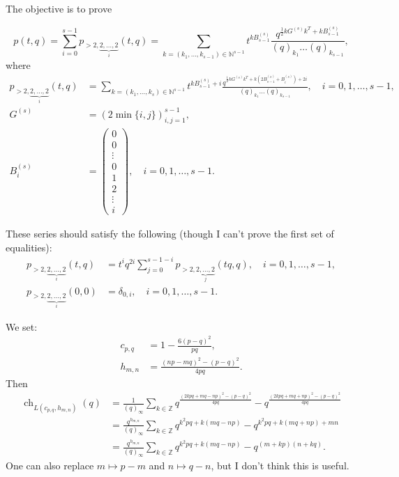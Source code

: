 \documentclass[a4paper, 12pt, reqno]{amsart}
\DeclareMathOperator{\ch}{ch}
\begin{document}
The objective is to prove

\begin{equation*}
  p(t, q) = \sum_{i = 0}^{s - 1}p_{>2, \underbrace{\scriptstyle{2, \dots, 2}}_i}(t, q) = \sum_{k = (k_1, \dots, k_{s - 1}) \in \mathbb{N}^{s - 1}}t^{kB^{(s)}_{s - 1}}\frac{q^{\frac{1}{2}kG^{(s)}k^T + kB^{(s)}_{s - 1}}}{(q)_{k_1}\dots (q)_{k_{s - 1}}},
\end{equation*}
where
\begin{align*}
  p_{>2, \underbrace{\scriptstyle{2, \dots, 2}}_i}(t, q) &= \sum_{k = (k_1, \dots, k_s) \in \mathbb{N}^{s - 1}}t^{kB^{(s)}_{s - 1} + i}\frac{q^{\frac{1}{2}kG^{(s)}k^T + k(2B^{(s)}_{s - 1} + B^{(s)}_i) + 2i}}{(q)_{k_1}\dots(q)_{k_{s - 1}}}, \quad i = 0, 1, \dots, s - 1, \\
  G^{(s)} &= (2\min\{i, j\})_{i, j = 1}^{s - 1}, \\
  B^{(s)}_i &=
            \left(\begin{smallmatrix}
                    0 \\
                    0 \\
                    \vdots \\
                    0 \\
                    1 \\
                    2 \\
                    \vdots \\
                    i
                  \end{smallmatrix}\right), \quad i = 0, 1, \dots, s - 1.  
\end{align*}

These series should satisfy the following (though I can't prove the first set of equalities):
\begin{align*}
  p_{>2, \underbrace{\scriptstyle{2, \dots, 2}}_i}(t, q) &= t^iq^{2i}\sum_{j = 0}^{s - 1 - i}p_{>2, \underbrace{\scriptstyle{2, \dots, 2}}_j}(tq, q), \quad i = 0, 1, \dots, s - 1, \\
  p_{>2, \underbrace{\scriptstyle{2, \dots, 2}}_i}(0, 0) &= \delta_{0, i}, \quad i = 0, 1, \dots, s - 1.
\end{align*}

We set:
\begin{align*}
  c_{p, q} &= 1 - \frac{6(p - q)^2}{pq}, \\
  h_{m, n} &= \frac{(np - mq)^2 - (p - q)^2}{4pq}.
\end{align*}
Then
\begin{align*}
  \ch_{L(c_{p, q}, h_{m, n})}(q) &= \frac{1}{(q)_{\infty}}\sum_{k \in \mathbb{Z}}q^{\frac{(2kpq + mq - np)^2 - (p - q)^2}{4pq}} - q^{\frac{(2kpq + mq + np)^2 - (p - q)^2}{4pq}} \\
                                 &= \frac{q^{h_{m, n}}}{(q)_{\infty}}\sum_{k \in \mathbb{Z}}q^{k^2pq + k(mq - np)}-q^{k^2pq + k(mq + np) + mn} \\
                                 &= \frac{q^{h_{m, n}}}{(q)_{\infty}}\sum_{k \in \mathbb{Z}}q^{k^2pq + k(mq - np)}-q^{(m + kp)(n + kq)}.
\end{align*}
One can also replace $m \mapsto p - m$ and $n \mapsto q - n$, but I don't think this is useful.
\end{document}
